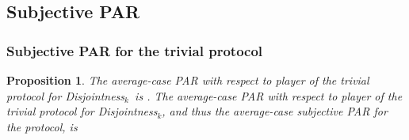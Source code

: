 \documentclass{article}
\theoremstyle{theorem}
\newtheorem{prop}[theorem]{Proposition}
\theoremstyle{definition}
\theoremstyle{remark}
\newcommand{\disjoint}{{\sc Dis\-joint\-ness}\ensuremath{_k}}
\begin{document}
\subsection{Subjective PAR}

\subsubsection{Subjective PAR for the trivial protocol}

\begin{prop}
The average-case PAR with respect to player  of the trivial protocol for \disjoint\ is .  The average-case PAR with respect to player  of the trivial protocol for \disjoint, and thus the average-case subjective PAR for the protocol, is

\end{prop}
\end{document}

